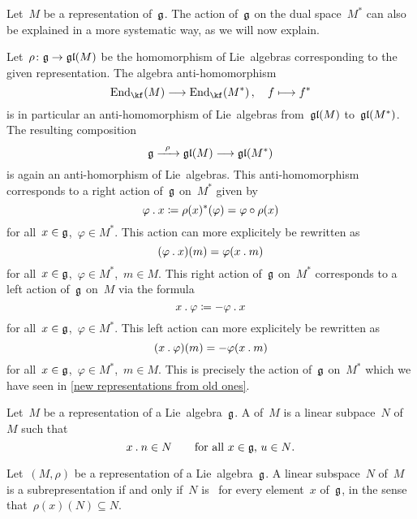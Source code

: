 \begin{remark}
  Let~$M$ be a representation of~$\mathfrak{g}$.
  The action of~$\mathfrak{g}$ on the dual space~$M^*$ can also be explained in a more systematic way, as we will now explain.

  Let~$\rho \colon \glie \to \gllie(M)$ be the homomorphism of Lie~algebras corresponding to the given representation.
  The algebra anti-homomorphism
  \[
    \End_{\kf}(M)
    \to
    \End_{\kf}(M^*) \,,
    \quad
    f
    \mapsto
    f^*
  \]
  is in particular an anti-homomorphism of Lie~algebras from~$\mathfrak{gl}(M)$ to~$\mathfrak{gl}(M^*)$.
  The resulting composition
  \[
    \glie
    \xto{\rho}
    \gllie(M)
    \to
    \gllie(M^*)
  \]
  is again an anti-homorphism of Lie~algebras.
  This anti-homomorphism corresponds to a right action of~$\mathfrak{g}$ on~$M^*$ given by
  \[
    \varphi \mathbin{.} x
    \coloneqq
    \rho(x)^*(\varphi)
    =
    \varphi \circ \rho(x)
  \]
  for all~$x \in \mathfrak{g}$,~$\varphi \in M^*$.
  This action can more explicitely be rewritten as
  \[
    (\varphi \mathbin{.} x)(m)
    =
    \varphi(x \mathbin{.} m)
  \]
  for all~$x \in \mathfrak{g}$,~$\varphi \in M^*$,~$m \in M$.
  This right action of~$\mathfrak{g}$ on~$M^*$ corresponds to a left action of~$\mathfrak{g}$ on~$M$ via the formula
  \[
    x \mathbin{.} \varphi
    \coloneqq
    -\varphi \mathbin{.} x
  \]
  for all~$x \in \mathfrak{g}$,~$\varphi \in M^*$.
  This left action can more explicitely be rewritten as
  \[
    (x \mathbin{.} \varphi)(m)
    =
    -\varphi(x \mathbin{.} m)
  \]
  for all~$x \in \mathfrak{g}$,~$\varphi \in M^*$,~$m \in M$.
  This is precisely the action of~$\mathfrak{g}$ on~$M^*$ which we have seen in \cref{new representations from old ones}.
\end{remark}


\begin{definition}
  Let~$M$ be a representation of a Lie~algebra~$\mathfrak{g}$.
  A  of~$M$ is a linear subpace~$N$ of~$M$ such that
  \[
    x \mathbin{.} n \in N
    \qquad
    \text{for all~$x \in \mathfrak{g}$,~$u \in N$.}
  \]
\end{definition}


\begin{remark}
  Let~$(M, \rho)$ be a representation of a Lie~algebra~$\mathfrak{g}$.
  A linear subspace~$N$ of~$M$ is a subrepresentation if and only if~$N$ is~{} for every element~$x$ of~$\mathfrak{g}$, in the sense that~$\rho(x)(N) \subseteq N$.
\end{remark}


